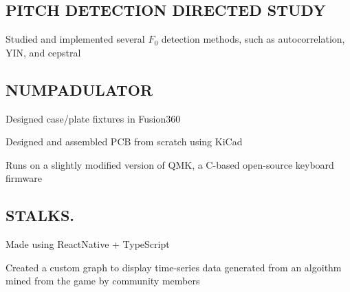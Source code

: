 \documentclass[letter,10pt]{article}
\begin{document}
\subsection{{PITCH DETECTION DIRECTED STUDY} \hfill {}}
\begin{zitemize}
\item Studied and implemented several $F_0$ detection methods, such as autocorrelation, YIN, and cepstral
\end{zitemize}

\subsection{{NUMPADULATOR} \hfill {}}
\begin{zitemize}
\item Designed case/plate fixtures in Fusion360
\item Designed and assembled PCB from scratch using KiCad
\item Runs on a slightly modified version of QMK, a C-based open-source keyboard firmware
\end{zitemize}

\subsection{{STALKS.} \hfill {}}
\begin{zitemize}
\item Made using ReactNative + TypeScript
\item Created a custom graph to display time-series data generated from an algoithm mined from the game by community members
\end{zitemize}
\end{document}
